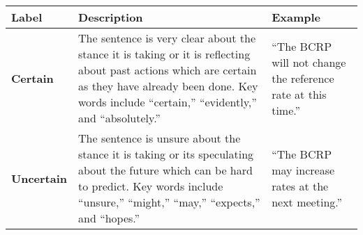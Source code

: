 \begin{table*}
    \caption{}
    \vspace{1em}
    \begin{tabular}{p{}p{}p{}}
    \toprule
    \textbf{Label} & \textbf{Description} & \textbf{Example}\\
    \midrule
    \textbf{Certain} & The sentence is very clear about the stance it is taking or it is reflecting about past actions which are certain as they have already been done. Key words include ``certain,'' ``evidently,'' and ``absolutely.'' & ``The BCRP will not change the reference rate at this time.''\\
    \midrule
    \textbf{Uncertain} & The sentence is unsure about the stance it is taking or its speculating about the future which can be hard to predict. Key words include ``unsure,'' ``might,'' ``may,'' ``expects,'' and ``hopes.'' & ``The BCRP may increase rates at the next meeting.'' \\
    \bottomrule
    \end{tabular}
    \label{tb:bcrp_certainty_guide}
    \end{table*}